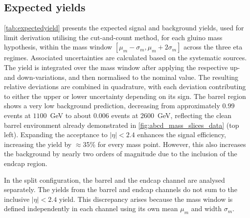 \subsection{Expected yields}
\label{sec:Expectedyields}

\cref{tab:expectedyield} presents the expected signal and background yields, used for limit derivation utilising the cut-and-count method, for each gluino mass hypothesis, within the mass window $[\mu_m - \sigma_m, \mu_m + 2\sigma_m]$ across the three eta regimes. Associated uncertainties are calculated based on the systematic sources. The yield is integrated over the mass window after applying the respective up- and down-variations, and then normalised to the nominal value. The resulting relative deviations are combined in quadrature, with each deviation contributing to either the upper or lower uncertainty depending on its sign. The barrel region shows a very low background prediction, decreasing from approximately $0.99$ events at $1100$~GeV to about $0.006$ events at $2600$~GeV, reflecting the clean barrel environment already demonstrated in \cref{fig:abcd_mass_slices_data} (top left). Expanding the acceptance to $|\eta|<2.4$ enhances the signal efficiency, increasing the yield by $\approx$35\% for every mass point. However, this also increases the background by nearly two orders of magnitude due to the inclusion of the endcap region.

In the split configuration, the barrel and the endcap channel are analysed separately. The yields from the barrel and endcap channels do not sum to the inclusive $|\eta|<2.4$ yield. This discrepancy arises because the mass window is defined independently in each channel using its own mean $\mu_m$ and width $\sigma_m$.

